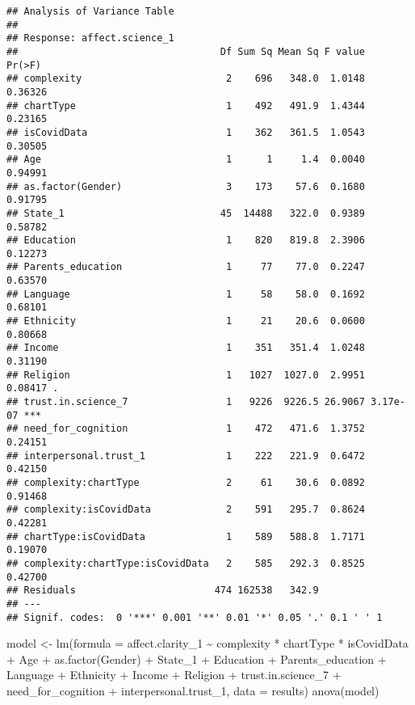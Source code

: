 \documentclass[
]{article}
\newenvironment{Shaded}{\begin{snugshade}}{\end{snugshade}}
\newcommand{\AttributeTok}[1]{\textcolor[rgb]{0.77,0.63,0.00}{#1}}
\newcommand{\FunctionTok}[1]{\textcolor[rgb]{0.00,0.00,0.00}{#1}}
\newcommand{\NormalTok}[1]{#1}
\newcommand{\OtherTok}[1]{\textcolor[rgb]{0.56,0.35,0.01}{#1}}
\newcommand{\SpecialCharTok}[1]{\textcolor[rgb]{0.00,0.00,0.00}{#1}}
\begin{document}
\begin{verbatim}
## Analysis of Variance Table
## 
## Response: affect.science_1
##                                   Df Sum Sq Mean Sq F value   Pr(>F)    
## complexity                         2    696   348.0  1.0148  0.36326    
## chartType                          1    492   491.9  1.4344  0.23165    
## isCovidData                        1    362   361.5  1.0543  0.30505    
## Age                                1      1     1.4  0.0040  0.94991    
## as.factor(Gender)                  3    173    57.6  0.1680  0.91795    
## State_1                           45  14488   322.0  0.9389  0.58782    
## Education                          1    820   819.8  2.3906  0.12273    
## Parents_education                  1     77    77.0  0.2247  0.63570    
## Language                           1     58    58.0  0.1692  0.68101    
## Ethnicity                          1     21    20.6  0.0600  0.80668    
## Income                             1    351   351.4  1.0248  0.31190    
## Religion                           1   1027  1027.0  2.9951  0.08417 .  
## trust.in.science_7                 1   9226  9226.5 26.9067 3.17e-07 ***
## need_for_cognition                 1    472   471.6  1.3752  0.24151    
## interpersonal.trust_1              1    222   221.9  0.6472  0.42150    
## complexity:chartType               2     61    30.6  0.0892  0.91468    
## complexity:isCovidData             2    591   295.7  0.8624  0.42281    
## chartType:isCovidData              1    589   588.8  1.7171  0.19070    
## complexity:chartType:isCovidData   2    585   292.3  0.8525  0.42700    
## Residuals                        474 162538   342.9                     
## ---
## Signif. codes:  0 '***' 0.001 '**' 0.01 '*' 0.05 '.' 0.1 ' ' 1
\end{verbatim}

\begin{Shaded}
\begin{Highlighting}[]
\NormalTok{model }\OtherTok{\textless{}{-}} \FunctionTok{lm}\NormalTok{(}\AttributeTok{formula =}\NormalTok{ affect.clarity\_1 }\SpecialCharTok{\textasciitilde{}}\NormalTok{ complexity }\SpecialCharTok{*}\NormalTok{ chartType }\SpecialCharTok{*}\NormalTok{ isCovidData }\SpecialCharTok{+}
\NormalTok{              Age }\SpecialCharTok{+} \FunctionTok{as.factor}\NormalTok{(Gender) }\SpecialCharTok{+}\NormalTok{ State\_1 }\SpecialCharTok{+}\NormalTok{ Education }\SpecialCharTok{+}\NormalTok{ Parents\_education }\SpecialCharTok{+}\NormalTok{ Language }\SpecialCharTok{+} 
\NormalTok{              Ethnicity }\SpecialCharTok{+}\NormalTok{ Income }\SpecialCharTok{+}\NormalTok{ Religion }\SpecialCharTok{+}\NormalTok{ trust.in.science\_7 }\SpecialCharTok{+} 
\NormalTok{              need\_for\_cognition }\SpecialCharTok{+}\NormalTok{ interpersonal.trust\_1,}
            \AttributeTok{data =}\NormalTok{ results)}
\FunctionTok{anova}\NormalTok{(model)}
\end{Highlighting}
\end{Shaded}
\end{document}
